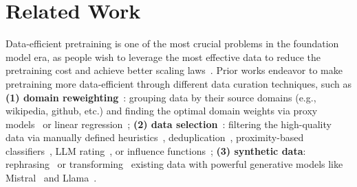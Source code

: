 \section{Related Work}


Data-efficient pretraining is one of the most crucial problems in the foundation model era, as people wish to leverage the most effective data to reduce the pretraining cost and achieve better scaling laws~\cite{kaplan2020scaling,Chinchilla}. Prior works endeavor to make pretraining more data-efficient through different data curation techniques, such as \textbf{(1) domain reweighting}~\cite{xie2024doremi}: grouping data by their source domains (e.g., wikipedia, github, etc.) and finding the optimal domain weights via proxy models~\cite{xie2024doremi,fan2023doge} or linear regression~\cite{liu2024regmix}; \textbf{(2) data selection}~\cite{t5}: filtering the high-quality data via manually defined heuristics~\cite{t5,rae2021scaling,penedo2024refinedweb,penedo2024fineweb}, deduplication~\cite{lee-etal-2022-deduplicating,abbas2023semdedup,penedo2024refinedweb,tirumala2024d4}, proximity-based classifiers~\cite{gao2020pile,wenzek2020ccnet,PaLM,du2022glam,gan2023ziya2,xie2023data,li2024datacomp}, LLM rating~\cite{wettig2024qurating,sachdeva2024askllm,penedo2024fineweb}, or influence functions~\cite{engstrom2024dsdm,yu2024mates,bai2024multi,zhang2024quad,wang2024greats}; \textbf{(3) synthetic data}: 
rephrasing~\cite{maini2024rephrasing,carranza_datologyai_2024,abdin2024phi} or transforming~\cite{yang2024synthetic,zhou2024programming} existing data with powerful generative models like Mistral~\cite{jiang2023mistral} and Llama~\cite{touvron2023llama,dubey2024llama}.


